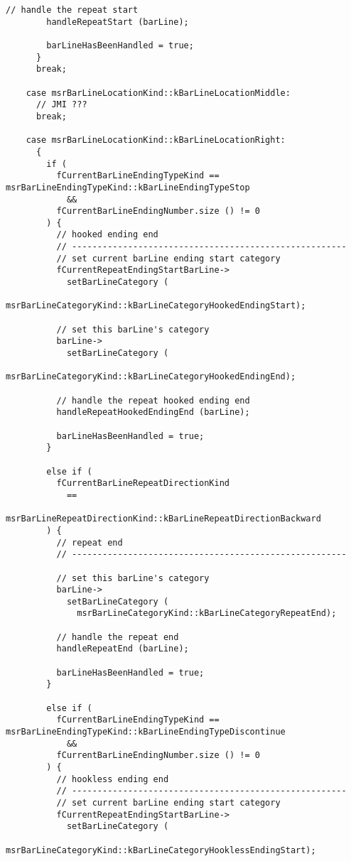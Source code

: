 \begin{lstlisting}[language=CPlusPlus]
        // handle the repeat start
        handleRepeatStart (barLine);

        barLineHasBeenHandled = true;
      }
      break;

    case msrBarLineLocationKind::kBarLineLocationMiddle:
      // JMI ???
      break;

    case msrBarLineLocationKind::kBarLineLocationRight:
      {
        if (
          fCurrentBarLineEndingTypeKind == msrBarLineEndingTypeKind::kBarLineEndingTypeStop
            &&
          fCurrentBarLineEndingNumber.size () != 0
        ) {
          // hooked ending end
          // ------------------------------------------------------
          // set current barLine ending start category
          fCurrentRepeatEndingStartBarLine->
            setBarLineCategory (
              msrBarLineCategoryKind::kBarLineCategoryHookedEndingStart);

          // set this barLine's category
          barLine->
            setBarLineCategory (
              msrBarLineCategoryKind::kBarLineCategoryHookedEndingEnd);

          // handle the repeat hooked ending end
          handleRepeatHookedEndingEnd (barLine);

          barLineHasBeenHandled = true;
        }

        else if (
          fCurrentBarLineRepeatDirectionKind
            ==
          msrBarLineRepeatDirectionKind::kBarLineRepeatDirectionBackward
        ) {
          // repeat end
          // ------------------------------------------------------

          // set this barLine's category
          barLine->
            setBarLineCategory (
              msrBarLineCategoryKind::kBarLineCategoryRepeatEnd);

          // handle the repeat end
          handleRepeatEnd (barLine);

          barLineHasBeenHandled = true;
        }

        else if (
          fCurrentBarLineEndingTypeKind == msrBarLineEndingTypeKind::kBarLineEndingTypeDiscontinue
            &&
          fCurrentBarLineEndingNumber.size () != 0
        ) {
          // hookless ending end
          // ------------------------------------------------------
          // set current barLine ending start category
          fCurrentRepeatEndingStartBarLine->
            setBarLineCategory (
              msrBarLineCategoryKind::kBarLineCategoryHooklessEndingStart);


\end{lstlisting}
